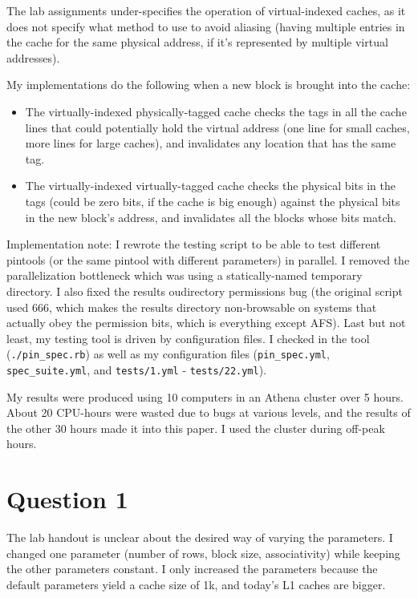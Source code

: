 The lab assignments under-specifies the operation of virtual-indexed caches, as
it does not specify what method to use to avoid aliasing (having multiple
entries in the cache for the same physical address, if it's represented by
multiple virtual addresses).

My implementations do the following when a new block is brought into the cache:
\begin{itemize}
  \item The virtually-indexed physically-tagged cache checks the tags in all
  the cache lines that could potentially hold the virtual address (one line for
  small caches, more lines for large caches), and invalidates any location that
  has the same tag.
  \item The virtually-indexed virtually-tagged cache checks the physical bits
  in the tags (could be zero bits, if the cache is big enough) against the
  physical bits in the new block's address, and invalidates all the blocks
  whose bits match.
\end{itemize}

Implementation note: I rewrote the testing script to be able to test different
pintools (or the same pintool with different parameters) in parallel. I removed
the parallelization bottleneck which was using a statically-named temporary
directory. I also fixed the results oudirectory permissions bug (the original
script used 666, which makes the results directory non-browsable on systems
that actually obey the permission bits, which is everything except AFS). Last
but not least, my testing tool is driven by configuration files. I checked in
the tool (\texttt{./pin_spec.rb}) as well as my configuration files
(\texttt{pin_spec.yml}, \texttt{spec_suite.yml}, and \texttt{tests/1.yml} -
\texttt{tests/22.yml}).

My results were produced using 10 computers in an Athena cluster over 5 hours.
About 20 CPU-hours were wasted due to bugs at various levels, and the results
of the other 30 hours made it into this paper. I used the cluster during
off-peak hours.

\section{Question 1}
The lab handout is unclear about the desired way of varying the parameters. I
changed one parameter (number of rows, block size, associativity) while keeping
the other parameters constant. I only increased the parameters because the
default parameters yield a cache size of 1k, and today's L1 caches are bigger.

